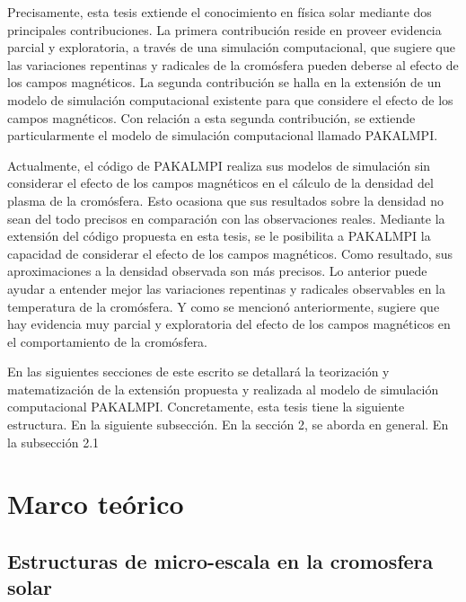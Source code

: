 \documentclass[9pt]{book}
\begin{document}
Precisamente, esta tesis extiende el conocimiento en f\'isica solar mediante dos principales contribuciones. La primera contribuci\'on reside en proveer evidencia parcial y exploratoria, a trav\'es de una simulaci\'on computacional, que sugiere que las variaciones repentinas y radicales de la crom\'osfera pueden deberse al efecto de los campos magn\'eticos. La segunda contribuci\'on se halla en la extensi\'on de un modelo de simulaci\'on computacional existente para que considere el efecto de los campos magn\'eticos. Con relaci\'on a esta segunda contribuci\'on, se extiende particularmente el modelo de simulaci\'on computacional llamado PAKALMPI. 

Actualmente, el c\'odigo de PAKALMPI realiza sus modelos de simulaci\'on sin considerar el efecto de los campos magn\'eticos en el c\'alculo de la densidad del plasma de la crom\'osfera. Esto ocasiona que sus resultados sobre la densidad no sean del todo precisos en comparaci\'on con las observaciones reales. Mediante la extensi\'on del c\'odigo propuesta en esta tesis, se le posibilita a PAKALMPI la capacidad de considerar el efecto de los campos magn\'eticos. Como resultado, sus aproximaciones a la densidad observada son m\'as precisos. Lo anterior puede ayudar a entender mejor las variaciones repentinas y radicales observables en la temperatura de la crom\'osfera. Y como se mencion\'o anteriormente, sugiere que hay evidencia muy parcial y exploratoria del efecto de los campos magn\'eticos en el comportamiento de la crom\'osfera.

En las siguientes secciones de este escrito se detallar\'a la teorizaci\'on y matematizaci\'on de la extensi\'on propuesta y realizada al modelo de simulaci\'on computacional PAKALMPI. Concretamente, esta tesis tiene la siguiente estructura. En la siguiente subsecci\'on. En la secci\'on 2, se aborda  en general. En la subsecci\'on 2.1






\chapter{Marco te\'orico}

\section{Estructuras de micro-escala en la cromosfera solar}
%
\end{document}
